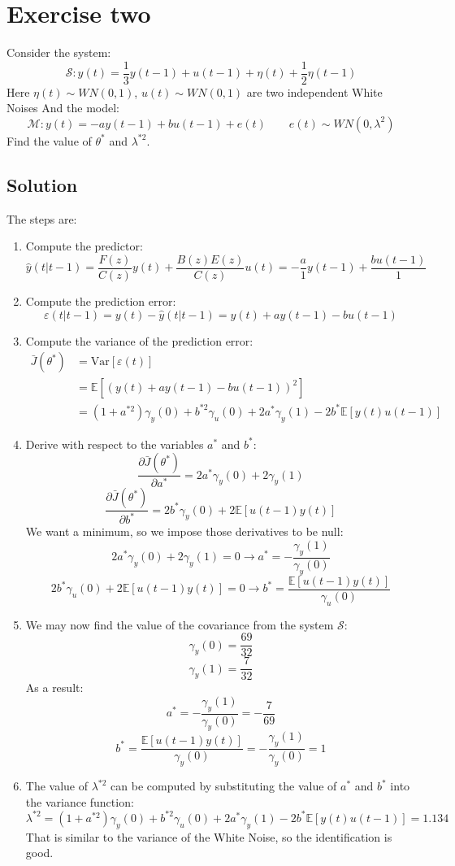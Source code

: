 \section{Exercise two}

Consider the system: 
\[\mathcal{S}:y(t)=\dfrac{1}{3}y(t-1)+u(t-1)+\eta(t)+\dfrac{1}{2}\eta(t-1)\]
Here $\eta(t)\sim WN(0,1)$, $u(t)\sim WN(0,1)$ are two independent  White Noises
And the model: 
\[\mathcal{M}:y(t)=-ay(t-1)+bu(t-1)+e(t) \qquad e(t)\sim WN(0,\lambda^2)\]
Find the value of $\theta^\ast$ and $\lambda^{\ast 2}$. 

\subsection*{Solution}
The steps are: 
\begin{enumerate}
    \item Compute the predictor: 
        \[\hat{y}(t|t-1)=\dfrac{F(z)}{C(z)}y(t)+\dfrac{B(z)E(z)}{C(z)}u(t)=-\dfrac{a}{1}y(t-1)+\dfrac{bu(t-1)}{1}\]
    \item Compute the prediction error: 
        \[\varepsilon(t|t-1)=y(t)-\hat{y}(t|t-1)=y(t)+ay(t-1)-bu(t-1)\]
    \item Compute the variance of the prediction error: 
        \begin{align*}
            \bar{J}(\theta^\ast)    &=\text{Var}\left[\varepsilon(t)\right]\\   
                                    &=\mathbb{E}\left[ {\left(y(t)+ay(t-1)-bu(t-1)\right)}^2 \right] \\
                                    &=\left(1+a^{\ast 2}\right)\gamma_y(0)+b^{\ast 2}\gamma_u(0)+2a^\ast \gamma_y(1)-2b^\ast\mathbb{E}\left[y(t)u(t-1)\right]
        \end{align*}
    \item Derive with respect to the variables $a^\ast$ and $b^\ast$: 
        \[\dfrac{\partial\bar{J}(\theta^\ast)}{\partial a^\ast}=2a^\ast\gamma_y(0)+2\gamma_y(1)\]
        \[\dfrac{\partial\bar{J}(\theta^\ast)}{\partial b^\ast}=2b^\ast\gamma_y(0)+2\mathbb{E}\left[u(t-1)y(t)\right]\]
        We want a minimum, so we impose those derivatives to be null: 
        \[2a^\ast\gamma_y(0)+2\gamma_y(1)=0 \rightarrow a^\ast=-\dfrac{\gamma_y(1)}{\gamma_y(0)}\]
        \[2b^\ast\gamma_u(0)+2\mathbb{E}\left[u(t-1)y(t)\right]=0 \rightarrow b^\ast=\dfrac{\mathbb{E}\left[u(t-1)y(t)\right]}{\gamma_u(0)}\]
    \item We may now find the value of the covariance from the system $\mathcal{S}$: 
        \[\gamma_y(0)=\dfrac{69}{32}\]
        \[\gamma_y(1)=\dfrac{7}{32}\]
        As a result: 
        \[a^\ast=-\dfrac{\gamma_y(1)}{\gamma_y(0)}=-\dfrac{7}{69}\]
        \[b^\ast=\dfrac{\mathbb{E}\left[u(t-1)y(t)\right]}{\gamma_y(0)}=-\dfrac{\gamma_y(1)}{\gamma_y(0)}=1\]
    \item The value of $\lambda^{\ast 2}$ can be computed by substituting the value of $a^\ast$ and $b^\ast$ into the variance function: 
        \[\lambda^{\ast 2}=\left(1+a^{\ast 2}\right)\gamma_y(0)+b^{\ast 2}\gamma_u(0)+2a^\ast\gamma_y(1)-2b^\ast\mathbb{E}\left[y(t)u(t-1)\right]=1.134\]
        That is similar to the variance of the  White Noise, so the identification is good. 
\end{enumerate}